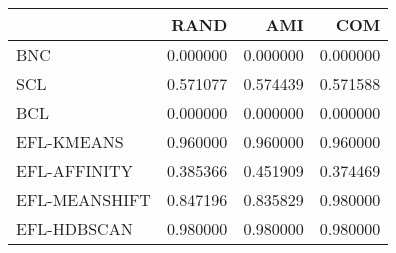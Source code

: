 \begin{tabular}{lrrr}
\toprule
 & RAND & AMI & COM \\
\midrule
BNC & 0.000000 & 0.000000 & 0.000000 \\
SCL & 0.571077 & 0.574439 & 0.571588 \\
BCL & 0.000000 & 0.000000 & 0.000000 \\
EFL-KMEANS & 0.960000 & 0.960000 & 0.960000 \\
EFL-AFFINITY & 0.385366 & 0.451909 & 0.374469 \\
EFL-MEANSHIFT & 0.847196 & 0.835829 & 0.980000 \\
EFL-HDBSCAN & 0.980000 & 0.980000 & 0.980000 \\
\bottomrule
\end{tabular}
